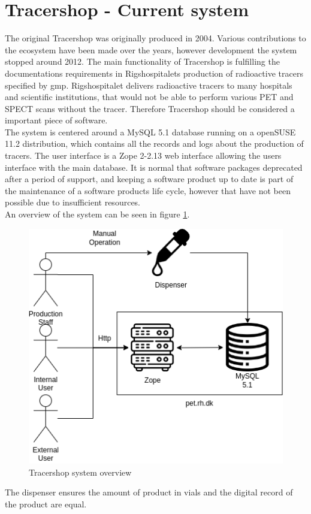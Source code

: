 \documentclass{article}
\begin{document}
\section*{Tracershop - Current system}
The original Tracershop was originally produced in 2004. Various contributions to the ecosystem have been made over the years,
however development the system stopped around 2012.
The main functionality of Tracershop is fulfilling the documentations requirements in Rigshospitalets production of radioactive tracers specified by \gls{gmp}.
Rigshospitalet delivers radioactive tracers to many hospitals and scientific institutions, that would not be able to perform various PET and SPECT scans without the tracer.
Therefore Tracershop should be considered a important piece of software.\\
The system is centered around a MySQL 5.1 database running on a openSUSE 11.2 distribution, which contains all the records and logs about the production of tracers.
The user interface is a Zope 2-2.13 web interface allowing the users interface with the main database.
It is normal that software packages deprecated after a period of support, and keeping a software product up to date is part of the maintenance of a software products life cycle,
however that have not been possible due to insufficient resources.\\
An overview of the system can be seen in figure \ref{fig:oldsys}.
\begin{figure}[ht]
  \begin{center}
    \includegraphics[width=0.6\linewidth]{OldSetup.png}
    \caption{Tracershop system overview}
    \label{fig:oldsys}
  \end{center}
\end{figure}
The dispenser ensures the amount of product in vials and the digital record of the product are equal.
\end{document}
